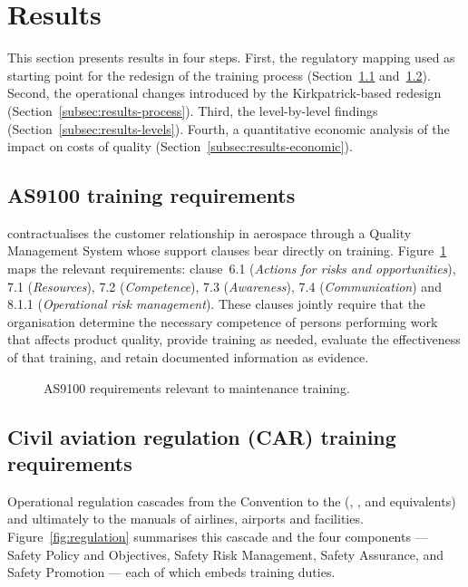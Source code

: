 \section{Results}
\label{sec:results}

This section presents results in four steps. First, the regulatory mapping
used as starting point for the redesign of the training process
(Section~\ref{subsec:results-as9100} and~\ref{subsec:results-regulation}).
Second, the operational changes introduced by the Kirkpatrick-based redesign
(Section~\ref{subsec:results-process}). Third, the level-by-level findings
(Section~\ref{subsec:results-levels}). Fourth, a quantitative economic
analysis of the impact on costs of quality (Section~\ref{subsec:results-economic}).

\subsection{AS9100 training requirements}
\label{subsec:results-as9100}

\AS{} contractualises the customer relationship in aerospace through a
Quality Management System whose support clauses bear directly on training.
Figure~\ref{fig:as9100} maps the relevant requirements: clause~6.1
(\textit{Actions for risks and opportunities}), 7.1 (\textit{Resources}),
7.2 (\textit{Competence}), 7.3 (\textit{Awareness}), 7.4
(\textit{Communication}) and 8.1.1 (\textit{Operational risk management}).
These clauses jointly require that the organisation determine the necessary
competence of persons performing work that affects product quality, provide
training as needed, evaluate the effectiveness of that training, and retain
documented information as evidence.

\begin{figure}[!tbp]
  \centering
  \resizebox{0.95\textwidth}{!}{}
  \caption{AS9100 requirements relevant to maintenance training.}
  \label{fig:as9100}
\end{figure}

\subsection{Civil aviation regulation (CAR) training requirements}
\label{subsec:results-regulation}

Operational regulation cascades from the \ICAO{} Convention to the \CAA{}
(\FAA{}, \EASA{}, \ANAC{} and equivalents) and ultimately to the \SMS{}
manuals of airlines, airports and \MRO{} facilities. Figure~\ref{fig:regulation}
summarises this cascade and the four \SMS{} components --- Safety Policy and
Objectives, Safety Risk Management, Safety Assurance, and Safety Promotion ---
each of which embeds training duties.

